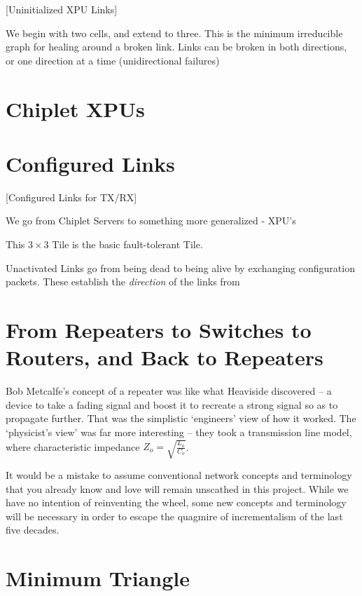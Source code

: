 \documentclass[../../../OAE-SPEC-MAIN.tex]{subfiles}
\begin{document}
[Uninitialized XPU Links]


We begin with two cells, and extend to three. This is the minimum irreducible graph for healing around a broken link. Links can be broken in both directions, or one direction at a time (unidirectional failures) 

\section{Chiplet XPUs}
\section{Configured Links}
[Configured Links for TX/RX]



We go from Chiplet Servers to something more generalized - XPU's 


This $3 \times 3$ Tile is the basic fault-tolerant Tile.


Unactivated Links go from being dead to being alive by exchanging configuration packets. These establish the \emph{direction} of the links from 

 
 
 \section{From Repeaters to Switches to Routers, and Back to Repeaters}
 
 Bob Metcalfe's concept of a repeater was like what Heaviside discovered -- a device to take a fading signal and boost it to recreate a strong signal so as to propagate further. That was the simplistic `engineers' view of how it worked.  The `physicist's view' was far more interesting -- they took a transmission line model, where characteristic impedance $Z_o = \sqrt{{\frac{L_o}{C_o}}}$. %
 
 It would be a mistake to assume conventional network concepts and terminology that you already know and love will remain unscathed in this project. While we have no intention of reinventing the wheel,  some new concepts and terminology will be necessary in order to escape the quagmire of incrementalism of the last five decades.  


 \section{Minimum Triangle}
 
\end{document}
